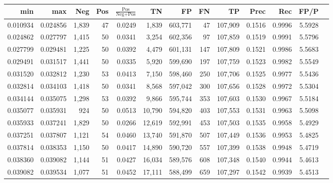 \begin{tabular}{rrrrrrrrrrrrr}
\toprule
     min &      max &   Neg & Pos & $\frac{\text{Pos}}{\text{Neg}+\text{Pos}}$ &      TN &      FP &      FN &      TP &   Prec &    Rec &   FP/P \\
\midrule
0.010934 & 0.024856 & 1,839 &  47 &                                     0.0249 &   1,839 & 603,771 &      47 & 107,909 & 0.1516 & 0.9996 & 5.5928 \\
0.024862 & 0.027797 & 1,415 &  50 &                                     0.0341 &   3,254 & 602,356 &      97 & 107,859 & 0.1519 & 0.9991 & 5.5796 \\
0.027799 & 0.029481 & 1,225 &  50 &                                     0.0392 &   4,479 & 601,131 &     147 & 107,809 & 0.1521 & 0.9986 & 5.5683 \\
0.029491 & 0.031517 & 1,441 &  50 &                                     0.0335 &   5,920 & 599,690 &     197 & 107,759 & 0.1523 & 0.9982 & 5.5549 \\
0.031520 & 0.032812 & 1,230 &  53 &                                     0.0413 &   7,150 & 598,460 &     250 & 107,706 & 0.1525 & 0.9977 & 5.5436 \\
0.032814 & 0.034103 & 1,418 &  50 &                                     0.0341 &   8,568 & 597,042 &     300 & 107,656 & 0.1528 & 0.9972 & 5.5304 \\
0.034144 & 0.035075 & 1,298 &  53 &                                     0.0392 &   9,866 & 595,744 &     353 & 107,603 & 0.1530 & 0.9967 & 5.5184 \\
0.035077 & 0.035931 &   924 &  50 &                                     0.0513 &  10,790 & 594,820 &     403 & 107,553 & 0.1531 & 0.9963 & 5.5098 \\
0.035933 & 0.037241 & 1,829 &  50 &                                     0.0266 &  12,619 & 592,991 &     453 & 107,503 & 0.1535 & 0.9958 & 5.4929 \\
0.037251 & 0.037807 & 1,121 &  54 &                                     0.0460 &  13,740 & 591,870 &     507 & 107,449 & 0.1536 & 0.9953 & 5.4825 \\
0.037814 & 0.038353 & 1,150 &  50 &                                     0.0417 &  14,890 & 590,720 &     557 & 107,399 & 0.1538 & 0.9948 & 5.4719 \\
0.038360 & 0.039082 & 1,144 &  51 &                                     0.0427 &  16,034 & 589,576 &     608 & 107,348 & 0.1540 & 0.9944 & 5.4613 \\
0.039082 & 0.039534 & 1,077 &  51 &                                     0.0452 &  17,111 & 588,499 &     659 & 107,297 & 0.1542 & 0.9939 & 5.4513 \\

\end{tabular}
